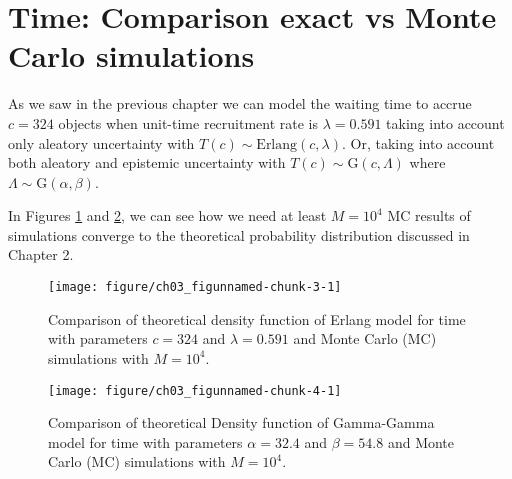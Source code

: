 \section{Time: Comparison exact vs Monte Carlo simulations}


As we saw in the previous chapter we can model the waiting time to accrue $c = 324$ objects when unit-time recruitment rate is $\lambda = 0.591$ taking into account only aleatory uncertainty with $T(c)\sim \textrm{Erlang}(c,\lambda)$. Or, taking into account both aleatory and epistemic uncertainty with $T(c)\sim\textrm{G}(c, \Lambda)$ where $\Lambda\sim \textrm{G}(\alpha,\beta)$.


In Figures \ref{fig:3_3} and \ref{fig:3_4}, we can see how we need at least $M=10^4$ MC results of simulations converge to the theoretical probability distribution discussed in Chapter 2.

% 
% 

\begin{figure}
\begin{knitrout}
\color{fgcolor}
\texttt{[image: figure/ch03\_figunnamed-chunk-3-1]} 
\end{knitrout}
\caption{Comparison of theoretical density function of Erlang model for time with parameters $c = 324$ and $\lambda = 0.591$ and Monte Carlo (MC) simulations with $M=10^4$.}
\label{fig:3_3}
\end{figure}


\begin{figure}
\begin{knitrout}
\color{fgcolor}
\texttt{[image: figure/ch03\_figunnamed-chunk-4-1]} 
\end{knitrout}
\caption{Comparison of theoretical Density function of Gamma-Gamma model for time with parameters $\alpha = 32.4$ and $\beta = 54.8$ and Monte Carlo (MC) simulations with $M=10^4$.}
\label{fig:3_4}
\end{figure}






